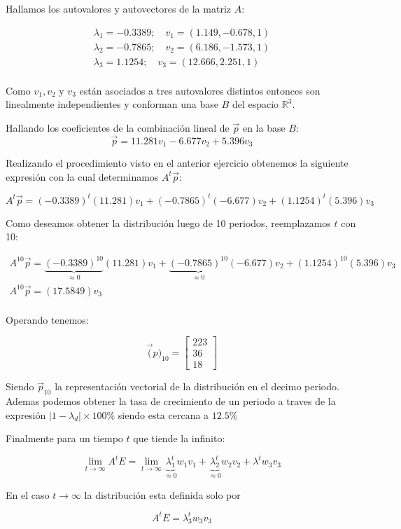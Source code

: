 Hallamos los autovalores y autovectores de la matriz $A$:

\begin{gather*}
    \lambda_1 = -0.3389; \quad v_1 = (1.149,-0.678,1)\\
    \lambda_2 = -0.7865; \quad v_2 = (6.186,-1.573,1)\\
    \lambda_3 = 1.1254; \quad v_3 = (12.666,2.251,1)\\
\end{gather*}

Como $v_1, v_2 \text{ y } v_3$ están asociados a tres autovalores distintos entonces son linealmente independientes y conforman una base $B$ del espacio $\mathbb{R}^3$.

Hallando los coeficientes de la combinación lineal de $\vec{p}$ en la base $B$:
\[
    \vec{p} = 11.281v_1 - 6.677v_2 + 5.396v_3
\]

Realizando el procedimiento visto en el anterior ejercicio obtenemos la siguiente expresión con la cual determinamos $A^t\vec{p}$:

\[
    A^t\vec{p} = (-0.3389)^t (11.281)v_1 + (-0.7865)^t(-6.677) v_2 + (1.1254)^t(5.396)v_3
\]

Como deseamos obtener la distribución luego de 10 periodos, reemplazamos $t$ con 10:


\begin{gather*}
   A^{10}\vec{p} = \underbrace{(-0.3389)^{10}}_{\approx 0} (11.281)v_1 + \underbrace{(-0.7865)^{10}}_{\approx 0}(-6.677) v_2 + (1.1254)^{10}(5.396) v_3\\
   A^{10}\vec{p} = (17.5849)v_3\\
\end{gather*}


Operando tenemos:

\[
\vec(p)_{10}  = 
\left[\begin{array}{c}
    223 \\
    36 \\
    18
\end{array}\right]
\]

Siendo $\vec{p}_{10}$ la representación vectorial de la distribución en el decimo periodo. Ademas podemos obtener la tasa de crecimiento de un periodo a traves de la expresión  \mbox{$|1 - \lambda_{d}|\times 100\%$} siendo esta cercana a $12.5\%$

Finalmente para un tiempo $t$ que tiende la infinito:

\[
	\lim_{t \to \infty} A^tE = \lim_{t \to \infty}\underbrace{\lambda_1^t}_{\approx 0} w_1v_1 + \underbrace{\lambda_2^t}_{\approx 0} w_2v_2+  \lambda^t w_3v_3
\]

En el caso $t \to \infty$ la distribución esta definida solo por

\[
    A^tE = \lambda^t_3 w_3v_3
\]

    
